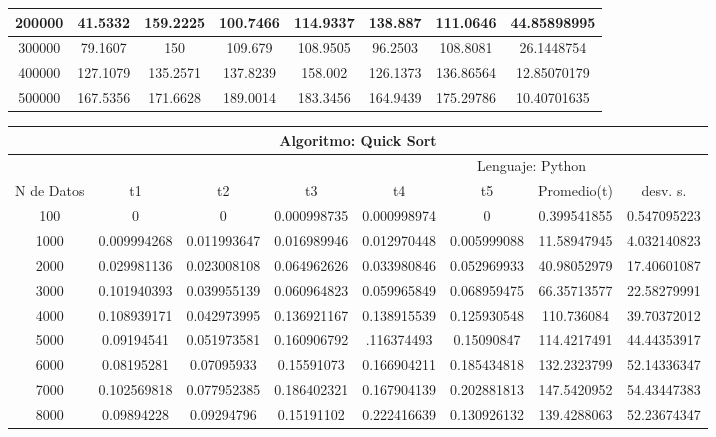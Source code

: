 \documentclass{article}
\begin{document}
\begin{table}[]
\begin{tabular}{|c|c|c|c|c|c|c|c| }
                200000	&41.5332	     &159.2225	&100.7466	&114.9337	&138.887	     &111.0646	&44.85898995\\ \hline
                300000	&79.1607	     &150	    &109.679	    &108.9505	&96.2503	     &108.8081	&26.1448754\\ \hline
                400000	&127.1079	&135.2571	&137.8239	&158.002	      &126.1373	&136.86564	&12.85070179\\ \hline
                500000	&167.5356	&171.6628	&189.0014	&183.3456	&164.9439	&175.29786	&10.40701635\\ \hline
        \end{tabular}
    \end{table}


            \begin{table}[]
        \begin{tabular}{|c|c|c|c|c|c|c|c| }
            \hline
            \multicolumn{8}{|c|}{Algoritmo: Quick Sort} \\ \hline
            \multicolumn{4}{|c|}{} & \multicolumn{4}{c|}{Lenguaje: Python} \\ \hline
              N de Datos &     t1    &  t2         &  t3          &   t4        &    t5     &   Promedio(t)       & desv. s. \\ \hline
100	&0	&0	&0.000998735&	0.000998974&	0	&0.399541855	&0.547095223\\ \hline
1000	&0.009994268	&0.011993647	&0.016989946	&0.012970448&	0.005999088	&11.58947945	&4.032140823\\ \hline
2000	&0.029981136	&0.023008108	&0.064962626	&0.033980846	&0.052969933	&40.98052979	&17.40601087\\ \hline
3000	&0.101940393	&0.039955139	&0.060964823	&0.059965849	&0.068959475	&66.35713577	&22.58279991\\ \hline
4000	&0.108939171	&0.042973995	&0.136921167	&0.138915539	&0.125930548	&110.736084	&39.70372012\\ \hline
5000	&0.09194541	&0.051973581	&0.160906792	&.116374493	&0.15090847	&114.4217491	&44.44353917\\ \hline
6000	&0.08195281	&0.07095933	&0.15591073	&0.166904211	&0.185434818	&132.2323799	&52.14336347\\ \hline
7000	&0.102569818	&0.077952385	&0.186402321	&0.167904139	&0.202881813	&147.5420952	&54.43447383\\ \hline
8000	&0.09894228	&0.09294796	&0.15191102	&0.222416639	&0.130926132	&139.4288063	&52.23674347\\ \hline

\end{tabular}
\end{table}
\end{document}
